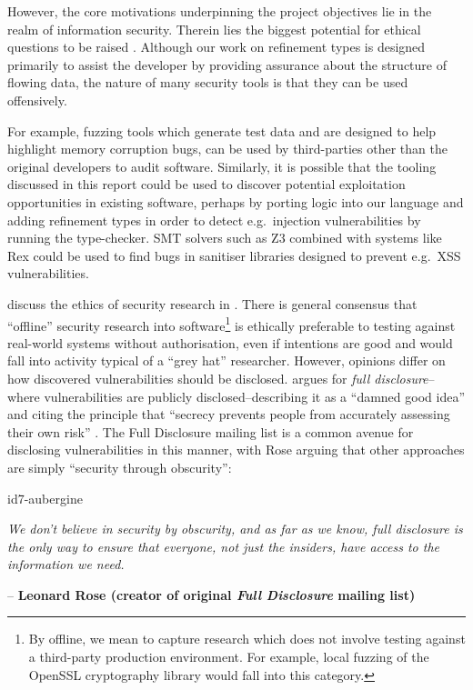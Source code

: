\documentclass[a4paper,openany,12pt]{book}
\begin{document}
However, the core motivations underpinning the project objectives lie in the realm of information security.
Therein lies the biggest potential for ethical questions to be raised \citep{dark2008ethics}.
Although our work on refinement types is designed primarily to assist the developer by providing assurance about the
structure of flowing data, the nature of many security tools is that they can be used offensively.

For example, fuzzing tools which generate test data and are designed to help highlight memory corruption bugs, can be
used by third-parties other than the original developers to audit software.
Similarly, it is possible that the tooling discussed in this report could be used to discover potential exploitation
opportunities in existing software, perhaps by porting logic into our language and adding refinement types in order to
detect e.g.\ injection vulnerabilities by running the type-checker.
SMT solvers such as Z3 combined with systems like Rex could be used to find bugs in sanitiser libraries designed to
prevent e.g.\ XSS vulnerabilities.

\citeauthor{harper2018gray} discuss the ethics of security research in \citet{harper2018gray}.
There is general consensus that ``offline'' security research into software\footnote{By offline, we mean to capture research which does not involve testing against a third-party production environment.
For example, local fuzzing of the OpenSSL cryptography library would fall into this category.} is ethically preferable
to testing against real-world systems without authorisation, even if intentions are good and would fall into activity
typical of a ``grey hat'' researcher.
However, opinions differ on how discovered vulnerabilities should be disclosed. \citeauthor{schneier2007fd} argues for
\textit{full disclosure}--where vulnerabilities are publicly disclosed--describing it as a ``damned good
idea'' and citing the principle that ``secrecy prevents people from accurately assessing their own risk'' \citep{schneier2007fd}.
The Full Disclosure mailing list is a common avenue for disclosing vulnerabilities in this manner, with Rose arguing
that other approaches are simply ``security through obscurity'':

\begin{mdframed}
    \begin{leftbar}{id7-aubergine}
        \vspace{0.25em}

        \textit{We don't believe in security by obscurity, and as far as we know, full disclosure is the only way to ensure that everyone, not just the insiders, have access to the information we need.} \\
        \vspace{0.25em}
    \end{leftbar}
    \vspace{-0.2em}
    \hfill \textcolor{id7-aubergine}{\Small \sffamily -- \textbf{Leonard Rose (creator of original \textit{Full Disclosure} mailing list)}}
    \rmfamily
\end{mdframed}
\end{document}
